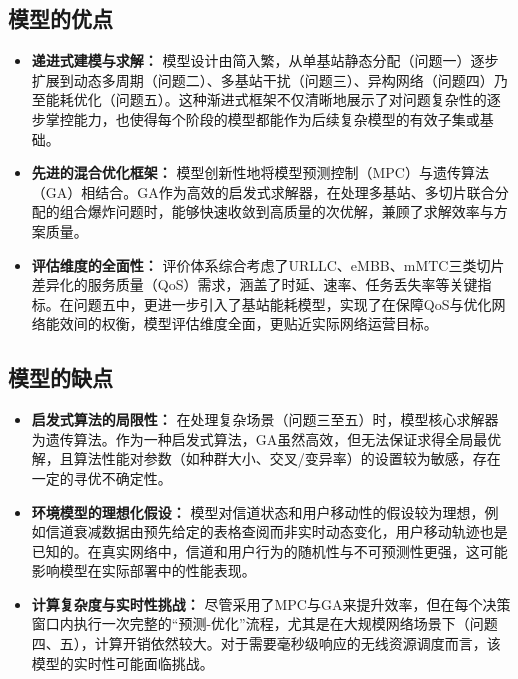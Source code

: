 \documentclass[withoutpreface,bwprint]{cumcmthesis}
\begin{document}
\subsection{模型的优点}
\begin{itemize}[itemindent=2em]
\item \textbf{递进式建模与求解：} 模型设计由简入繁，从单基站静态分配（问题一）逐步扩展到动态多周期（问题二）、多基站干扰（问题三）、异构网络（问题四）乃至能耗优化（问题五）。这种渐进式框架不仅清晰地展示了对问题复杂性的逐步掌控能力，也使得每个阶段的模型都能作为后续复杂模型的有效子集或基础。
\item \textbf{先进的混合优化框架：} 模型创新性地将模型预测控制（MPC）与遗传算法（GA）相结合。GA作为高效的启发式求解器，在处理多基站、多切片联合分配的组合爆炸问题时，能够快速收敛到高质量的次优解，兼顾了求解效率与方案质量。
\item \textbf{评估维度的全面性：} 评价体系综合考虑了URLLC、eMBB、mMTC三类切片差异化的服务质量（QoS）需求，涵盖了时延、速率、任务丢失率等关键指标。在问题五中，更进一步引入了基站能耗模型，实现了在保障QoS与优化网络能效间的权衡，模型评估维度全面，更贴近实际网络运营目标。
\end{itemize}

\subsection{模型的缺点}
\begin{itemize}[itemindent=2em]
\item \textbf{启发式算法的局限性：} 在处理复杂场景（问题三至五）时，模型核心求解器为遗传算法。作为一种启发式算法，GA虽然高效，但无法保证求得全局最优解，且算法性能对参数（如种群大小、交叉/变异率）的设置较为敏感，存在一定的寻优不确定性。
\item \textbf{环境模型的理想化假设：} 模型对信道状态和用户移动性的假设较为理想，例如信道衰减数据由预先给定的表格查阅而非实时动态变化，用户移动轨迹也是已知的。在真实网络中，信道和用户行为的随机性与不可预测性更强，这可能影响模型在实际部署中的性能表现。
\item \textbf{计算复杂度与实时性挑战：} 尽管采用了MPC与GA来提升效率，但在每个决策窗口内执行一次完整的“预测-优化”流程，尤其是在大规模网络场景下（问题四、五），计算开销依然较大。对于需要毫秒级响应的无线资源调度而言，该模型的实时性可能面临挑战。
\end{itemize}

\nocite{*}
\end{document}

